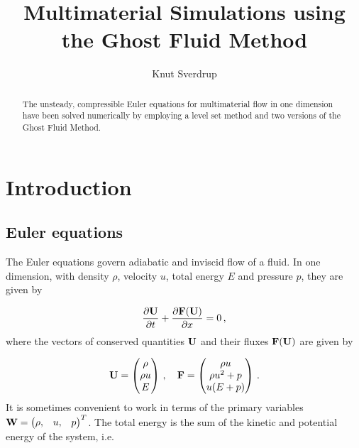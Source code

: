 \documentclass[final,3p,twocolumn]{elsarticle}
\begin{document}
\begin{frontmatter}

\title{Multimaterial Simulations using the Ghost Fluid Method}

\author{Knut Sverdrup}

\address{Cavendish Laboratory, Department of Physics, J J Thomson
  Avenue, Cambridge. CB3 0HE}

\begin{abstract}
    The unsteady, compressible Euler equations for multimaterial flow in one
    dimension have been solved numerically by employing a level set method and
    two versions of the Ghost Fluid Method. 
\end{abstract}

\end{frontmatter}

\section{Introduction}
\label{sec:introduction}

\subsection{Euler equations}
\label{subsec:euler}

The Euler equations govern adiabatic and inviscid flow of a fluid. In one dimension, with density $\rho$, velocity $u$, total energy $E$ and pressure $p$, they are given by 

\begin{equation}
    \frac{\partial {\bf U}}{\partial t} 
    + \frac{\partial {\bf F(U)}}{\partial x} = 0\,,
\end{equation}
%
where the vectors of conserved quantities ${\bf U}$ and their fluxes ${\bf F(U)}$ are given by

\begin{equation}
    {\bf U} = 
    \begin{pmatrix} 
        \rho \\ 
        \rho u \\ 
        E 
    \end{pmatrix}
    \,,\quad
    {\bf F} = 
    \begin{pmatrix}
        \rho u \\ 
        \rho u^2 + p \\
        u(E+p) 
    \end{pmatrix}
    \,.
\end{equation}
%
It is sometimes convenient to work in terms of the primary variables ${\bf W} = \begin{pmatrix} \rho, & u, & p \end{pmatrix}^T$. The total energy is the sum of the kinetic and potential energy of the system, i.e.~ 
\end{document}
